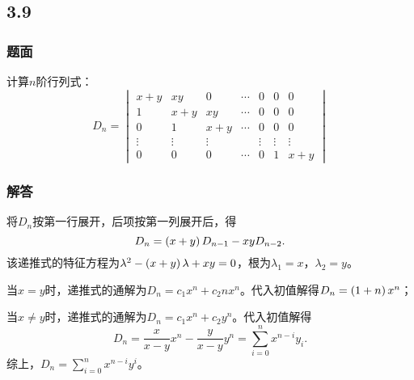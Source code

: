 \documentclass[10pt,xcolor=svgnames]{beamer} %
\begin{document}
\subsection*{3.9}
\begin{frame}
    \frametitle{题面}
    计算\(n\)阶行列式：
    \begin{equation*}
        D_n=
        \begin{vmatrix}
            x+y    & xy     & 0      & \cdots & 0      & 0      & 0      \\
            1      & x+y    & xy     & \cdots & 0      & 0      & 0      \\
            0      & 1      & x+y    & \cdots & 0      & 0      & 0      \\
            \vdots & \vdots & \vdots &        & \vdots & \vdots & \vdots \\
            0      & 0      & 0      & \cdots & 0      & 1      & x+y
        \end{vmatrix}
    \end{equation*}
\end{frame}
\begin{frame}
    \frametitle{解答}
    将\(D_n\)按第一行展开，后项按第一列展开后，得
    \begin{equation*}
        D_n=\left( x+y \right)D_{n-1}-xyD_{n-2}.
    \end{equation*}
    该递推式的特征方程为\(\lambda^2-\left( x+y \right)\lambda+xy=0\)，根为\(\lambda_1=x\)，\(\lambda_2=y\)。
    \pause

    当\(x=y\)时，递推式的通解为\(D_n=c_1x^n+c_2nx^n\)。代入初值解得\(D_n=\left( 1+n \right)x^n\)；

    当\(x\neq y\)时，递推式的通解为\(D_n=c_1x^n+c_2y^n\)。代入初值解得
    \begin{equation*}
        D_n=\frac{x}{x-y}x^n-\frac{y}{x-y}y^n=\sum_{i=0}^{n}x^{n-i}y_i.
    \end{equation*}
    综上，\(D_n=\sum_{i=0}^{n}x^{n-i}y^i\)。
\end{frame}
\end{document}
